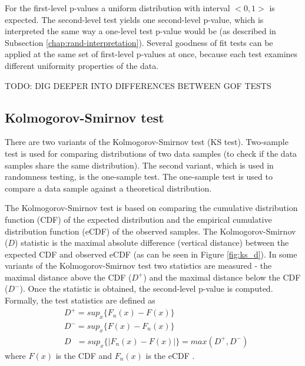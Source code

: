 \documentclass[
  digital,     %
  oneside,     %
  nosansbold,  %
  nocolorbold, %
  nolof,         %
  nolot,         %
]{fithesis4}
\begin{document}
For the first-level p-values a uniform distribution with interval $<0,1>$ is expected. The second-level test yields one second-level p-value, which is interpreted the same way a one-level test p-value would be (as described in Subsection \ref{chap:rand-interpretation}). Several goodness of fit tests can be applied at the same set of first-level p-values at once, because each test examines different uniformity properties of the data.

TODO: DIG DEEPER INTO DIFFERENCES BETWEEN GOF TESTS

\subsection{Kolmogorov-Smirnov test}
There are two variants of the Kolmogorov-Smirnov test (KS test). Two-sample test is used for comparing distributions of two data samples (to check if the data samples share the same distribution). The second variant, which is used in randomness testing, is the one-sample test. The one-sample test is used to compare a data sample against a theoretical distribution.

The Kolmogorov-Smirnov test is based on comparing the cumulative distribution function (CDF) of the expected distribution and the empirical cumulative distribution function (eCDF) of the observed samples. The Kolmogorov-Smirnov ($D$) statistic is the maximal absolute difference (vertical distance) between the expected CDF and observed eCDF (as can be seen in Figure \ref{fig:ks_d}). In some variants of the Kolmogorov-Smirnov test two statistics are measured - the maximal distance above the CDF ($D^+$) and the maximal distance below the CDF ($D^-$). Once the statistic is obtained, the second-level p-value is computed. Formally, the test statistics are defined as
\[\begin{split}
    &D^+ = sup_x\{F_n(x) - F(x)\}\\
    &D^- = sup_x\{F(x) - F_n(x)\}\\
    &D \:\:\:= sup_x\{|F_n(x) - F(x)|\} = max(D^+, D^-)
\end{split}
\] where $F(x)$ is the CDF and $F_n(x)$ is the  eCDF \cite[p. 100]{GOF-techniques}.
\end{document}
